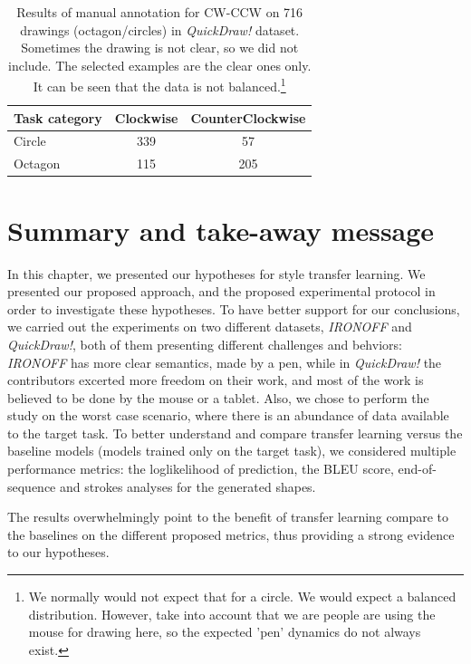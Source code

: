 \begin{table}[!htbp]
  \centering
  \begin{tabular}{l c c}
  \hline
  Task category & Clockwise & CounterClockwise\\ \hline
  Circle &  339 & 57 \\ \hline
  Octagon & 115 & 205 \\ \hline
  \end{tabular}
  \caption{Results of manual annotation for CW-CCW on 716 drawings (octagon/circles) in \textit{QuickDraw!} dataset. Sometimes the drawing is not clear, so we did not include. The selected examples are the clear ones only. It can be seen that the data is not balanced.\footnote{We normally would not expect that for a circle. We would expect a balanced distribution. However, take into account that we are people are using the mouse for drawing here, so the expected 'pen' dynamics do not always exist.}}
  \label{table:cw_ccw_annotation}
\end{table}


\section{Summary and take-away message}
\par In this chapter, we presented our hypotheses for style transfer learning. We presented our proposed approach, and the proposed experimental protocol in order to investigate these hypotheses. To have better support for our conclusions, we carried out the experiments on two different datasets, \textit{IRONOFF} and \textit{QuickDraw!}, both of them presenting different challenges and behviors: \textit{IRONOFF} has more clear semantics, made by a pen, while in \textit{QuickDraw!} the contributors excerted more freedom on their work, and most of the work is believed to be done by the mouse or a tablet. Also, we chose to perform the study on the worst case scenario, where there is an abundance of data available to the target task. To better understand and compare transfer learning versus the baseline models (models trained only on the target task), we considered multiple performance metrics: the loglikelihood of prediction, the BLEU score, end-of-sequence and strokes analyses for the generated shapes.

\par The results overwhelmingly point to the benefit of transfer learning compare to the baselines on the different proposed metrics, thus providing a strong evidence to our hypotheses.
